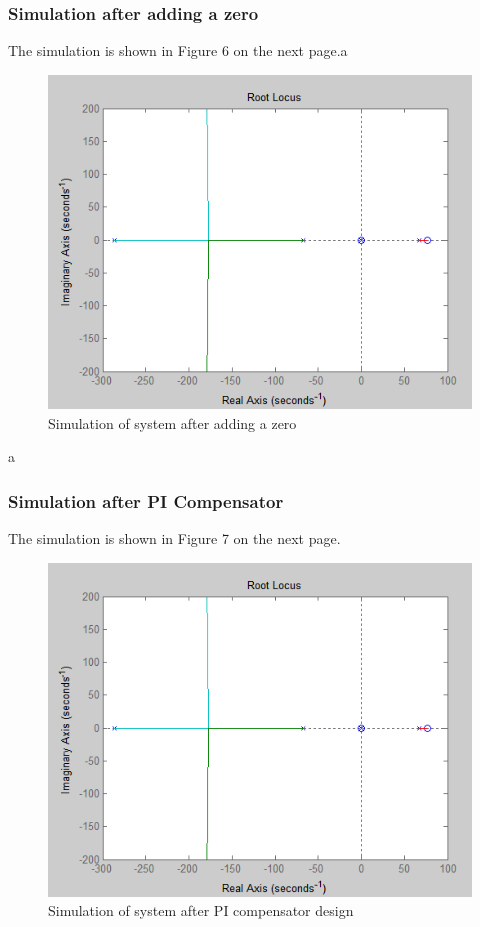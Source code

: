 \documentclass{article}
\begin{document}
\subsubsection{Simulation after adding a zero}
The simulation is shown in Figure 6 on the next page.a\begin{figure}[h]
  \includegraphics[width=\linewidth]{fig3.PNG}
  \caption{Simulation of system after adding a zero}
  \label{fig:boat1}
\end{figure}
a\subsubsection{Simulation after PI Compensator}
The simulation is shown in Figure 7 on the next page.
\begin{figure}[h]
  \includegraphics[width=\linewidth]{fig3.PNG}
  \caption{Simulation of system after PI compensator design}
  \label{fig:boat1}
\end{figure}
\end{document}
